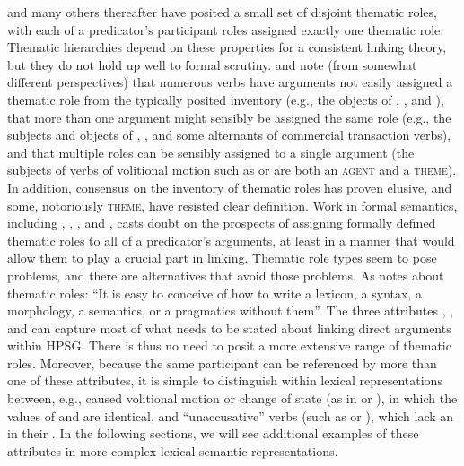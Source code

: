 \documentclass[output=paper
 	        ,biblatex
                ,babelshorthands
                ,newtxmath
                ,draftmode
                ,colorlinks, citecolor=brown
]{langscibook}
\begin{document}
\citet{Fillmore1968} and many others thereafter have posited a small set of disjoint thematic roles,
with each of a predicator's participant roles assigned exactly one thematic role.  Thematic
hierarchies depend on these properties for a consistent linking theory, but they do not hold up well
to formal scrutiny.  \citet{Jackendoff1987} and \citet{Dowty1991} note (from somewhat different
perspectives) that numerous verbs have arguments not easily assigned a thematic role from the
typically posited inventory (e.g., the objects of , , and ), that
more than one argument might sensibly be assigned the same role (e.g., the subjects and objects of
, , and some alternants of commercial transaction verbs), and that
multiple roles can be sensibly assigned to a single argument (the subjects of verbs of volitional
motion such as  or  are both an \textsc{agent} and a \textsc{theme}).  In
addition, consensus on the inventory of thematic roles has proven elusive, and some, notoriously
\textsc{theme}, have resisted clear definition.  Work in formal semantics, including
\citet{LadusawandDowty1988}, \citet{Dowty1989}, \citet{Landman2000}, and \citet{Schein2002}, casts
doubt on the prospects of assigning formally defined thematic roles to all of a predicator's
arguments, at least in a manner that would allow them to play a crucial part in linking.  Thematic
role types seem to pose problems, and there are alternatives that avoid those problems.  As
\citet[35]{Carlson1998} notes about thematic roles: ``It is easy to conceive of how to write a
lexicon, a syntax, a morphology, a semantics, or a pragmatics without them''.  The three attributes
, , and  can capture most of what needs to be stated about linking
direct arguments within HPSG.  There is thus no need to posit a more extensive range of thematic
roles.  Moreover, because the same participant can be referenced by more than one of these
attributes, it is simple to distinguish within lexical representations between, e.g., caused
volitional motion or change of state (as in  or ), in which the values of
 and  are identical, and ``unaccusative'' verbs (such as  or
), which lack an  in their .  In the following sections, we
will see additional examples of these attributes in more complex lexical semantic representations.%
%
%
\end{document}
